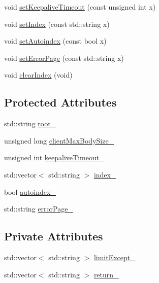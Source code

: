\begin{DoxyCompactItemize}
void \hyperlink{classft_1_1_base_directives_a0818b8529872ba9622329e2118d20c39}{set\+Keepalive\+Timeout} (const unsigned int x)
\item 
void \hyperlink{classft_1_1_base_directives_a6d3d8fd6eaaf71304128af6b3cee2a69}{set\+Index} (const std\+::string x)
\item 
void \hyperlink{classft_1_1_base_directives_ae7293c7bbf34e9bdc60c540dccd53342}{set\+Autoindex} (const bool x)
\item 
void \hyperlink{classft_1_1_base_directives_a505ecc88b3e1779583ad60cc243c7769}{set\+Error\+Page} (const std\+::string x)
\item 
void \hyperlink{classft_1_1_base_directives_a36d96dc74e650162c25a325813130ab2}{clear\+Index} (void)
\end{DoxyCompactItemize}
\subsection*{Protected Attributes}
\begin{DoxyCompactItemize}
\item 
std\+::string \hyperlink{classft_1_1_base_directives_abb1eaf0bba10b90172d6152e69457dc7}{root\+\_\+}
\item 
unsigned long \hyperlink{classft_1_1_base_directives_ad65c2594d2a90ca065d410dfd4066a19}{client\+Max\+Body\+Size\+\_\+}
\item 
unsigned int \hyperlink{classft_1_1_base_directives_aa1f5f394b428d0d18765a9b9e14e648f}{keepalive\+Timeout\+\_\+}
\item 
std\+::vector$<$ std\+::string $>$ \hyperlink{classft_1_1_base_directives_a6ba30626837f300201cd32c35d50aa49}{index\+\_\+}
\item 
bool \hyperlink{classft_1_1_base_directives_a4ebffbe32f50a462afa139c6f03c1a4f}{autoindex\+\_\+}
\item 
std\+::string \hyperlink{classft_1_1_base_directives_a5c0d388109f086503961de84fe3fce90}{error\+Page\+\_\+}
\end{DoxyCompactItemize}
\subsection*{Private Attributes}
\begin{DoxyCompactItemize}
\item 
std\+::vector$<$ std\+::string $>$ \hyperlink{classft_1_1_location_block_a8fec53119566b5654a7b902a1c53c6d9}{limit\+Except\+\_\+}
\item 
std\+::vector$<$ std\+::string $>$ \hyperlink{classft_1_1_location_block_abab721f365aff66f8a1289de21c8f01f}{return\+\_\+}
\end{DoxyCompactItemize}


